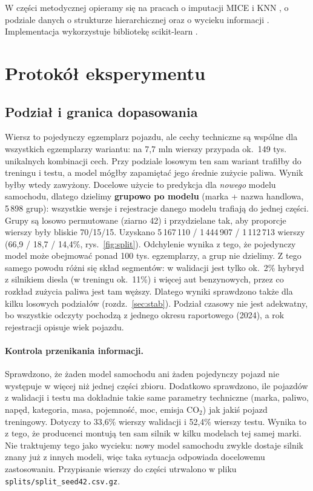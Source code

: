 \documentclass[10pt,twocolumn,a4paper]{article}
\begin{document}
W części metodycznej opieramy się na pracach o imputacji MICE
\cite{vanbuuren2011mice} i KNN \cite{troyanskaya2001knn}, o podziale danych
o strukturze hierarchicznej \cite{roberts2017cv} oraz o wycieku informacji
\cite{kaufman2012leakage}. Implementacja wykorzystuje bibliotekę
scikit-learn \cite{pedregosa2011sklearn}.

\section{Protokół eksperymentu}
\subsection{Podział i granica dopasowania}
Wiersz to pojedynczy egzemplarz pojazdu, ale cechy techniczne są wspólne dla
wszystkich egzemplarzy wariantu: na 7,7 mln wierszy przypada ok.\ 149 tys.
unikalnych kombinacji cech. Przy podziale losowym ten sam wariant trafiłby do
treningu i testu, a model mógłby zapamiętać jego średnie zużycie paliwa. Wynik
byłby wtedy zawyżony. Docelowe użycie to predykcja dla \emph{nowego} modelu
samochodu, dlatego dzielimy \textbf{grupowo po modelu} (marka + nazwa
handlowa, 5\,898 grup): wszystkie wersje i rejestracje danego modelu trafiają
do jednej części. Grupy są losowo permutowane (ziarno 42) i przydzielane tak,
aby proporcje wierszy były bliskie 70/15/15. Uzyskano 5\,167\,110 /
1\,444\,907 / 1\,112\,713 wierszy (66,9 / 18,7 / 14,4\%, rys.~\ref{fig:split}).
Odchylenie wynika z tego, że pojedynczy model może obejmować ponad 100 tys.
egzemplarzy, a grup nie dzielimy. Z tego samego powodu różni się skład
segmentów: w walidacji jest tylko ok.\ 2\% hybryd z silnikiem diesla (w treningu
ok.\ 11\%) i więcej aut benzynowych, przez co rozkład zużycia paliwa jest tam
węższy. Dlatego wyniki sprawdzono także dla kilku losowych podziałów
(rozdz.~\ref{sec:stab}). Podział czasowy nie jest adekwatny, bo
wszystkie odczyty pochodzą z jednego okresu raportowego (2024), a rok
rejestracji opisuje wiek pojazdu.

\paragraph{Kontrola przenikania informacji.} Sprawdzono, że żaden model
samochodu ani żaden pojedynczy pojazd nie występuje w więcej niż jednej części
zbioru. Dodatkowo sprawdzono, ile pojazdów z walidacji i testu ma dokładnie
takie same parametry techniczne (marka, paliwo, napęd, kategoria, masa,
pojemność, moc, emisja CO$_2$) jak jakiś pojazd treningowy. Dotyczy to
33,6\% wierszy walidacji i 52,4\% wierszy testu. Wynika to z tego, że
producenci montują ten sam silnik w kilku modelach tej samej marki. Nie
traktujemy tego jako wycieku: nowy model samochodu zwykle dostaje silnik znany
już z innych modeli, więc taka sytuacja odpowiada docelowemu zastosowaniu.
Przypisanie wierszy do części utrwalono w pliku
\texttt{splits/split\_seed42.csv.gz}.
\end{document}
